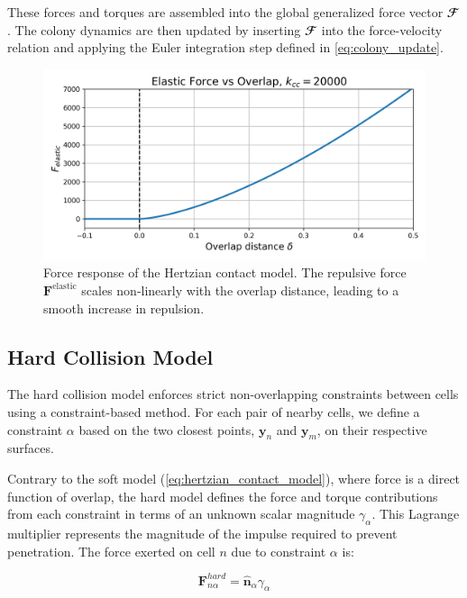\documentclass[conference]{IEEEtran}
\begin{document}
These forces and torques are assembled into the global generalized force vector $\mathbfcal{F}$. The colony dynamics are then updated by inserting $\mathbfcal{F}$ into the force-velocity relation and applying the Euler integration step defined in \autoref{eq:colony_update}.



\begin{figure}[H]
    \centering
    \includegraphics[width=\linewidth]{figures/hertzian_contact_model.png} %
    \caption{Force response of the Hertzian contact model. The repulsive force $\mathbf{F}^{\text{elastic}}$ scales non-linearly with the overlap distance, leading to a smooth increase in repulsion.}
    \label{fig:hertzian_contact_model}
\end{figure}

\subsection{Hard Collision Model}


The hard collision model enforces strict non-overlapping constraints between cells using a constraint-based method. For each pair of nearby cells, we define a constraint $\alpha$ based on the two closest points, $\mathbf{y}_n$ and $\mathbf{y}_m$, on their respective surfaces.

Contrary to the soft model (\autoref{eq:hertzian_contact_model}), where force is a direct function of overlap, the hard model defines the force and torque contributions from each constraint in terms of an unknown scalar magnitude $\gamma_\alpha$. This Lagrange multiplier represents the magnitude of the impulse required to prevent penetration. The force exerted on cell $n$ due to constraint $\alpha$ is:

\begin{equation} \label{eq:constraint_force}
    \mathbf{F}^{hard}_{n\alpha} = \hat{\mathbf{n}}_\alpha \gamma_\alpha
\end{equation}
\end{document}
